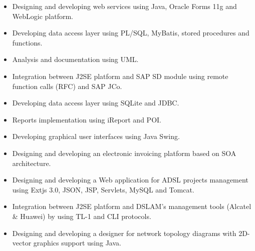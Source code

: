 \documentclass[10pt,a4paper,ragged2e]{altacv}
\begin{document}
\vspace{10px}

\begin{itemize}
   \item Designing and developing web services using Java, Oracle Forms 11g and WebLogic platform.
   \item Developing data access layer using  PL/SQL, MyBatis, stored procedures and functions.
   \item Analysis and documentation using UML.
\end{itemize}

\vspace{10px}

\begin{itemize}
   \item Integration between J2SE platform and SAP SD module using remote function calls (RFC) and SAP JCo.
   \item Developing data access layer using SQLite and JDBC.
   \item Reports implementation using iReport and POI.
   \item Developing graphical user interfaces using Java Swing.
   \item Designing and developing an electronic invoicing platform based on SOA architecture.
\end{itemize}

\vspace{10px}

\begin{itemize}
   \item Designing and developing a Web application for ADSL projects management using Extjs 3.0, JSON, JSP, Servlets, MySQL and Tomcat.
   \item Integration between J2SE platform and DSLAM's management tools (Alcatel \& Huawei) by using TL-1 and CLI protocols.
   \item Designing and developing a designer for network topology diagrams with 2D-vector graphics support using Java.
\end{itemize}
\end{document}
